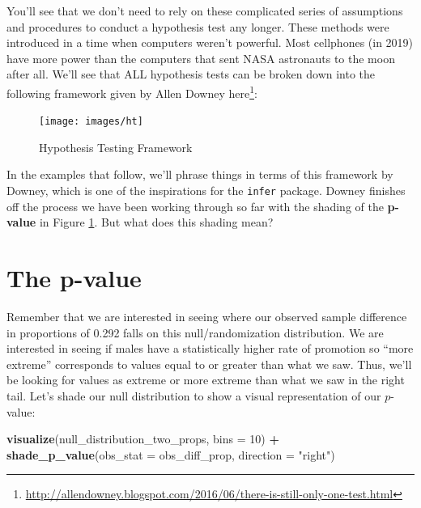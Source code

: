 \documentclass[12pt, krantz2,]{krantz}
\makeatletter
\newenvironment{Shaded}{\begin{snugshade}}{\end{snugshade}}
\newcommand{\DataTypeTok}[1]{\textcolor[rgb]{0.27,0.27,0.27}{#1}}
\newcommand{\DecValTok}[1]{\textcolor[rgb]{0.06,0.06,0.06}{#1}}
\newcommand{\KeywordTok}[1]{\textcolor[rgb]{0.27,0.27,0.27}{\textbf{#1}}}
\newcommand{\NormalTok}[1]{#1}
\newcommand{\OperatorTok}[1]{\textcolor[rgb]{0.43,0.43,0.43}{\textbf{#1}}}
\newcommand{\StringTok}[1]{\textcolor[rgb]{0.5,0.5,0.5}{#1}}
\renewcommand{\href}[2]{#2\footnote{\url{#1}}}
\newenvironment{kframe}{%
\medskip{}
\setlength{\fboxsep}{.8em}
 \def\at@end@of@kframe{}%
 \ifinner\ifhmode%
  \def\at@end@of@kframe{\end{minipage}}%
  \begin{minipage}{\columnwidth}%
 \fi\fi%
 \def\FrameCommand##1{\hskip\@totalleftmargin \hskip-\fboxsep
 \colorbox{shadecolor}{##1}\hskip-\fboxsep
     \hskip-\linewidth \hskip-\@totalleftmargin \hskip\columnwidth}%
 \MakeFramed {\advance\hsize-\width
   \@totalleftmargin\z@ \linewidth\hsize
   \@setminipage}}%
 {\par\unskip\endMakeFramed%
 \at@end@of@kframe}
\renewenvironment{Shaded}{\begin{kframe}}{\end{kframe}}
\makeatother
\begin{document}
You'll see that we don't need to rely on these complicated series of assumptions and procedures to conduct a hypothesis test any longer. These methods were introduced in a time when computers weren't powerful. Most cellphones (in 2019) have more power than the computers that sent NASA astronauts to the moon after all. We'll see that ALL hypothesis tests can be broken down into the following framework given by Allen Downey \href{http://allendowney.blogspot.com/2016/06/there-is-still-only-one-test.html}{here}:

\begin{figure}

{\centering \texttt{[image: images/ht]} 

}

\caption{Hypothesis Testing Framework}\label{fig:htdowney}
\end{figure}

In the examples that follow, we'll phrase things in terms of this framework by Downey, which is one of the inspirations for the \texttt{infer} package. Downey finishes off the process we have been working through so far with the shading of the \textbf{p-value} in Figure \ref{fig:htdowney}. But what does this shading mean?

\hypertarget{p-value}{%
\section{The p-value}\label{p-value}}

Remember that we are interested in seeing where our observed sample difference in proportions of 0.292 falls on this null/randomization distribution. We are interested in seeing if males have a statistically higher rate of promotion so ``more extreme'' corresponds to values equal to or greater than what we saw. Thus, we'll be looking for values as extreme or more extreme than what we saw in the right tail. Let's shade our null distribution to show a visual representation of our \(p\)-value:

\begin{Shaded}
\begin{Highlighting}[]
\KeywordTok{visualize}\NormalTok{(null_distribution_two_props, }\DataTypeTok{bins =} \DecValTok{10}\NormalTok{) }\OperatorTok{+}\StringTok{ }
\StringTok{  }\KeywordTok{shade_p_value}\NormalTok{(}\DataTypeTok{obs_stat =}\NormalTok{ obs_diff_prop, }\DataTypeTok{direction =} \StringTok{"right"}\NormalTok{)}
\end{Highlighting}
\end{Shaded}
\end{document}
